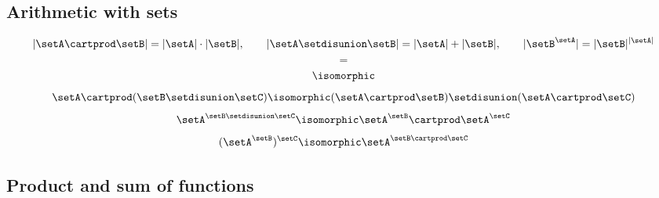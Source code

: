 \begin{forslides}
\subsection{Arithmetic with sets}

\begin{equation}\label{eq:slides_session2_163}
\vert \setA \cartprod \setB \vert = \vert \setA \vert \cdot \vert \setB \vert, \qquad \vert \setA \setdisunion \setB \vert = \vert \setA \vert + \vert \setB \vert, \qquad \vert \setB^{\setA} \vert = \vert \setB \vert^{\vert \setA \vert}
\end{equation}
\begin{equation}\label{eq:slides_session2_164}
=
\end{equation}
\begin{equation}\label{eq:slides_session2_165}
\isomorphic
\end{equation}
\begin{equation}\label{eq:slides_session2_166}
\setA \cartprod (\setB \setdisunion \setC)  \isomorphic (\setA \cartprod \setB) \setdisunion (\setA \cartprod \setC)
\end{equation}
\begin{equation}\label{eq:slides_session2_167}
\setA^{\setB \setdisunion \setC}            \isomorphic \setA^\setB \cartprod \setA^\setC
\end{equation}
\begin{equation}\label{eq:slides_session2_168}
(\setA^\setB)^\setC                         \isomorphic \setA^{\setB \cartprod \setC}
\end{equation}

\subsection{Product and sum of functions}


\end{forslides}
